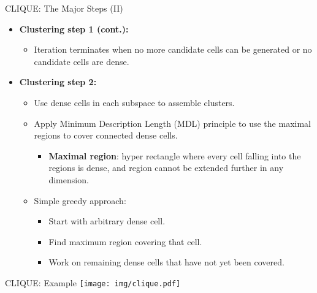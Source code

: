 \begin{frame}{CLIQUE: The Major Steps (II)}
	\begin{itemize}
		\item \textbf{Clustering step 1 (cont.):}
		      \begin{itemize}
			      \item Iteration terminates when no more candidate cells can be
			            generated or no candidate cells are dense.
		      \end{itemize}
		\item \textbf{Clustering step 2:}
		      \begin{itemize}
			      \item Use dense cells in each subspace to assemble clusters.
			      \item Apply Minimum Description Length (MDL) principle to use the
			            maximal regions to cover connected dense cells.
			            \begin{itemize}
				            \item \textbf{\color{airforceblue}Maximal region}: hyper
				                  rectangle where every cell falling into the regions is dense,
				                  and region cannot be extended further in any dimension.
			            \end{itemize}
			      \item Simple greedy approach:
			            \begin{itemize}
				            \item Start with arbitrary dense cell.
				            \item Find maximum region covering that cell.
				            \item Work on remaining dense cells that have not yet been
				                  covered.
			            \end{itemize}
		      \end{itemize}
	\end{itemize}
\end{frame}

\begin{frame}{CLIQUE: Example}
	\centering
	\texttt{[image: img/clique.pdf]}
\end{frame}

